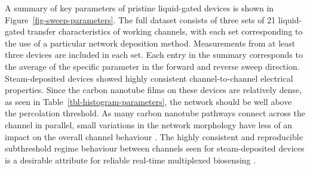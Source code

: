 \documentclass[
  a4paper,
]{scrbook}
\begin{document}
A summary of key parameters of pristine liquid-gated devices is shown in
Figure~\ref{fig-sweep-parameters}. The full dataset consists of three
sets of 21 liquid-gated transfer characteristics of working channels,
with each set corresponding to the use of a particular network
deposition method. Measurements from at least three devices are included
in each set. Each entry in the summary corresponds to the average of the
specific parameter in the forward and reverse sweep direction.
Steam-deposited devices showed highly consistent channel-to-channel
electrical properties. Since the carbon nanotube films on these devices
are relatively dense, as seen in Table~\ref{tbl-histogram-parameters},
the network should be well above the percolation threshold. As many
carbon nanotube pathways connect across the channel in parallel, small
variations in the network morphology have less of an impact on the
overall channel behaviour \autocite{Murugathas2018}. The highly
consistent and reproducible subthreshold regime behaviour between
channels seen for steam-deposited devices is a desirable attribute for
reliable real-time multiplexed biosensing
\autocite{Kauffman2008,Heller2009,Gao2010}.
\end{document}
